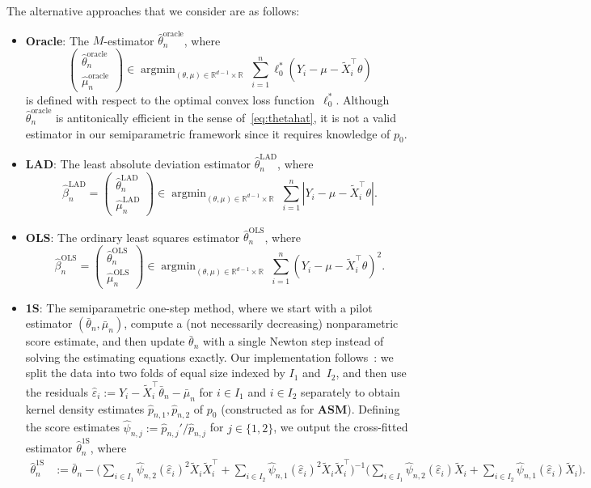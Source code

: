 \documentclass[a4paper]{article}
\newcommand{\R}{\mathbb{R}}
\DeclareMathOperator*{\argmin}{argmin}
\theoremstyle{definition}
\begin{document}
The alternative approaches that we consider are as follows:
\begin{itemize}
\item \textbf{Oracle}: The $M$-estimator $\hat{\theta}_n^{\mathrm{oracle}}$, where
\[
\begin{pmatrix}
\hat{\theta}_n^{\mathrm{oracle}} \\
\hat{\mu}_n^{\mathrm{oracle}} 
\end{pmatrix}
\in \argmin_{(\theta, \mu) \in \R^{d-1} \times \R}\;\sum_{i=1}^n \ell_0^*(Y_i - \mu - \tilde{X}_i^\top\theta)
\]
is defined with respect to the optimal convex loss function~$\ell_0^*$. Although $\hat{\theta}_n^{\mathrm{oracle}}$ is antitonically efficient in the sense of~\eqref{eq:thetahat}, it is not a valid estimator in our semiparametric framework since it requires knowledge of $p_0$. 
\item \textbf{LAD}: The least absolute deviation estimator $\hat{\theta}_n^{\mathrm{LAD}}$, where
\[
\hat{\beta}_n^{\mathrm{LAD}} =
\begin{pmatrix}
\hat{\theta}_n^{\mathrm{LAD}} \\
\hat{\mu}_n^{\mathrm{LAD}}
\end{pmatrix} 
\in \argmin_{(\theta, \mu) \in \R^{d-1} \times \mathbb{R}}\;\sum_{i=1}^n |Y_i - \mu - \tilde{X}_i^\top\theta|.
\]
\item \textbf{OLS}: The ordinary least squares estimator $\hat{\theta}_n^{\mathrm{OLS}}$, where
\[
\hat{\beta}_n^{\mathrm{OLS}} =
\begin{pmatrix}
\hat{\theta}_n^{\mathrm{OLS}} \\
\hat{\mu}_n^{\mathrm{OLS}}
\end{pmatrix} 
\in \argmin_{(\theta, \mu) \in \R^{d-1} \times \mathbb{R}}\;\sum_{i=1}^n (Y_i - \mu - \tilde{X}_i^\top\theta)^2.
\]
\item \textbf{1S}: The semiparametric one-step method, where we start with a pilot estimator $(\bar{\theta}_n,\bar{\mu}_n)$, compute a (not necessarily decreasing) nonparametric score estimate, and then update $\bar{\theta}_n$ with a single Newton step instead of solving the estimating equations exactly. Our implementation follows~\citet[Chapter~25.8]{vdV1998asymptotic}: we split the data into two folds of equal size indexed by $I_1$ and~$I_2$, and then use the residuals $\hat{\varepsilon}_i := Y_i - \tilde{X}_i^\top \bar{\theta}_n - \bar{\mu}_n$ for $i \in I_1$ and $i \in I_2$ separately to obtain kernel density estimates $\hat{p}_{n,1},\hat{p}_{n,2}$ of $p_0$ (constructed as for \textbf{ASM}).  Defining the score estimates $\hat{\psi}_{n,j} := \hat{p}_{n,j}'/\hat{p}_{n,j}$ for $j \in \{1,2\}$, we output the cross-fitted estimator $\hat{\theta}_n^{\mathrm{1S}}$, where
\begin{align*}
\hat{\theta}_n^{\mathrm{1S}} &:= \bar{\theta}_n - \biggl(\sum_{i \in I_1}\hat{\psi}_{n,2}(\hat{\varepsilon}_i)^2 \tilde{X}_i \tilde{X}_i^\top + \sum_{i \in I_2}\hat{\psi}_{n,1}(\hat{\varepsilon}_i)^2 \tilde{X}_i \tilde{X}_i^\top\biggr)^{-1}\biggl(\sum_{i \in I_1}\hat{\psi}_{n,2}(\hat{\varepsilon}_i)\tilde{X}_i + \sum_{i \in I_2}\hat{\psi}_{n,1}(\hat{\varepsilon}_i)\tilde{X}_i\biggr).
\end{align*}


\end{itemize}
\end{document}
